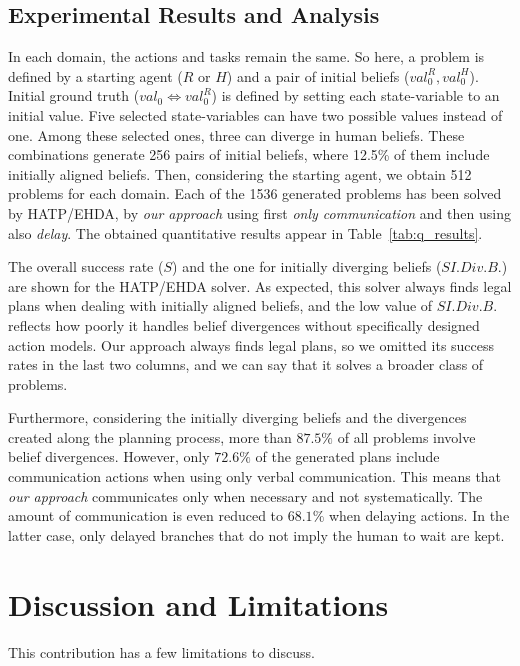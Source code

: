 {\subsection{Experimental Results and Analysis}

In each domain, the actions and tasks remain the same. So here, a problem is defined by a starting agent ($R$ or $H$) and a pair of initial beliefs ($val^R_0, val^H_ 0$).
Initial ground truth ($val_0 \Leftrightarrow val^R_0$) is defined by setting each state-variable to an initial value. Five selected state-variables can have two possible values instead of one. Among these selected ones, three can diverge in human beliefs. These combinations generate 256 pairs of initial beliefs, where 12.5\% of them include initially aligned beliefs. Then, considering the starting agent, we obtain 512 problems for each domain. 
Each of the 1536 generated problems has been solved by HATP/EHDA, by \textit{our approach} using first \textit{only communication} and then using also \textit{delay}.
The obtained quantitative results appear in Table~\ref{tab:q_results}.
 
The overall success rate ($S$) and the one for initially diverging beliefs ($S I.Div.B.$) are shown for the HATP/EHDA solver. As expected, this solver always finds legal plans when dealing with initially aligned beliefs, and the low value of $S I.Div.B.$ reflects how poorly it handles belief divergences without specifically designed action models.
Our approach always finds legal plans, so we omitted its success rates in the last two columns, and we can say that it solves a broader class of problems.

Furthermore, considering the initially diverging beliefs and the divergences created along the planning process, more than $87.5\%$ of all problems involve belief divergences. 
However, only $72.6\%$ of the generated plans include communication actions when using only verbal communication.
This means that \textit{our approach} communicates only when necessary and not systematically. 
The amount of communication is even reduced to $68.1\%$ when delaying actions. In the latter case, only delayed branches that do not imply the human to wait are kept. 

\section{Discussion and Limitations}

This contribution has a few limitations to discuss.

}
